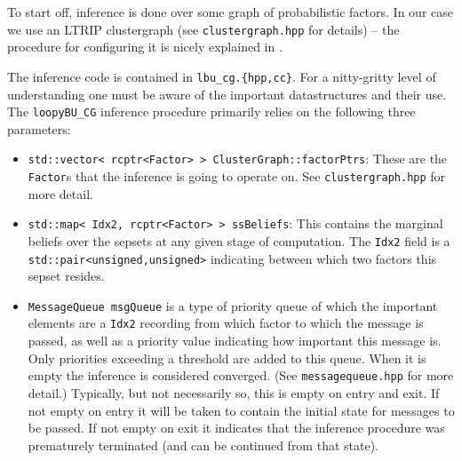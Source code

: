 \documentclass[oneside,english]{scrbook}
\begin{document}
To start off, inference is done over some graph of probabilistic
factors. In our case we use an LTRIP clustergraph (see
\texttt{clustergraph.hpp} for details) -- the procedure for configuring
it is nicely explained in \cite{Streicher2017}.

The inference code is contained in \texttt{lbu\_cg.\{hpp,cc\}}. For a
nitty-gritty level of understanding one must be aware of the important
datastructures and their use. The \texttt{loopyBU\_CG} inference
procedure primarily relies on the following three parameters:
\begin{itemize}
\item \texttt{std::vector< rcptr<Factor> > ClusterGraph::factorPtrs}:
  These are the \texttt{Factor}s that the inference is going to
  operate on. See \texttt{clustergraph.hpp} for more detail.
\item \texttt{std::map< Idx2, rcptr<Factor> > ssBeliefs}: This
  contains the marginal beliefs over the sepsets at any given stage of
  computation. The \texttt{Idx2} field is a
  \texttt{std::pair<unsigned,unsigned>} indicating between which two
  factors this sepset resides.
\item \texttt{MessageQueue msgQueue} is a type of priority queue of
  which the important elements are a \texttt{Idx2} recording from
  which factor to which the message is passed, as well as a priority
  value indicating how important this message is. Only priorities
  exceeding a threshold are added to this queue. When it is empty the
  inference is considered converged. (See \texttt{messagequeue.hpp}
  for more detail.) Typically, but not necessarily so, this is empty
  on entry and exit. If not empty on entry it will be taken to contain
  the initial state for messages to be passed. If not empty on exit it
  indicates that the inference procedure was prematurely terminated
  (and can be continued from that state).

\end{itemize}
\end{document}
